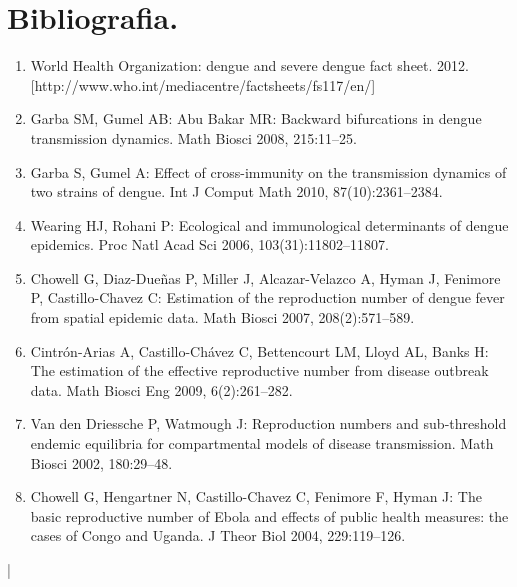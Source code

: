 	\newpage
	\section{\textbf{Bibliografia.}}
	\bigskip
		\begin{enumerate}
			\item 
			World Health Organization: dengue and severe dengue fact sheet.
			2012. [http://www.who.int/mediacentre/factsheets/fs117/en/]
			\item
			Garba SM, Gumel AB: Abu Bakar MR: Backward bifurcations in
			dengue transmission dynamics. Math Biosci 2008, 215:11–25.
			\item
			Garba S, Gumel A: Effect of cross-immunity on the transmission
			dynamics of two strains of dengue. Int J Comput Math 2010,
			87(10):2361–2384.
			\item
			Wearing HJ, Rohani P: Ecological and immunological determinants of
			dengue epidemics. Proc Natl Acad Sci 2006, 103(31):11802–11807.
			\item
			Chowell G, Diaz-Dueñas P, Miller J, Alcazar-Velazco A, Hyman J,
			Fenimore P, Castillo-Chavez C: Estimation of the reproduction number
			of dengue fever from spatial epidemic data. Math Biosci 2007,
			208(2):571–589.
			\item
			Cintrón-Arias A, Castillo-Chávez C, Bettencourt LM, Lloyd AL, Banks H:
			The estimation of the effective reproductive number from disease
			outbreak data. Math Biosci Eng 2009, 6(2):261–282.
			\item
			Van den Driessche P, Watmough J: Reproduction numbers and
			sub-threshold endemic equilibria for compartmental models of
			disease transmission. Math Biosci 2002, 180:29–48.
			\item
			Chowell G, Hengartner N, Castillo-Chavez C, Fenimore F, Hyman J:
			The basic reproductive number of Ebola and effects of public health
			measures: the cases of Congo and Uganda. J Theor Biol 2004,
			229:119–126.
		\end{enumerate}
|	
	
	
		